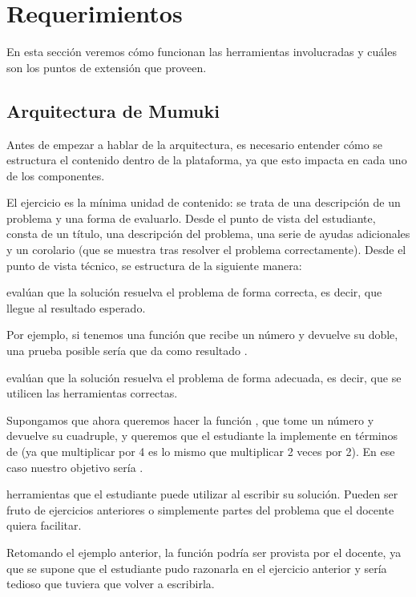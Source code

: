 
\section{Requerimientos}
En esta sección veremos cómo funcionan las herramientas involucradas y cuáles son los puntos de extensión que proveen.

\subsection{Arquitectura de Mumuki}
Antes de empezar a hablar de la arquitectura, es necesario entender cómo se estructura el contenido dentro de la plataforma, ya que esto impacta en cada uno de los componentes.

El ejercicio es la mínima unidad de contenido: se trata de una descripción de un problema y una forma de evaluarlo. Desde el punto de vista del estudiante, consta de un título, una descripción del problema, una serie de ayudas adicionales y un corolario (que se muestra tras resolver el problema correctamente). Desde el punto de vista técnico, se estructura de la siguiente manera:

\begin{itemize}
   evalúan que la solución resuelva el problema de forma correcta, es decir, que llegue al resultado esperado.

  Por ejemplo, si tenemos una función  que recibe un número y devuelve su doble, una prueba posible sería que  da como resultado .

   evalúan que la solución resuelva el problema de forma adecuada, es decir, que se utilicen las herramientas correctas.

  Supongamos que ahora queremos hacer la función , que tome un número y devuelve su cuadruple, y queremos que el estudiante la implemente en términos de  (ya que multiplicar por 4 es lo mismo que multiplicar 2 veces por 2). En ese caso nuestro objetivo sería .

   herramientas que el estudiante puede utilizar al escribir su solución. Pueden ser fruto de ejercicios anteriores o simplemente partes del problema que el docente quiera facilitar.

  Retomando el ejemplo anterior, la función  podría ser provista por el docente, ya que se supone que el estudiante pudo razonarla en el ejercicio anterior y sería tedioso que tuviera que volver a escribirla.
\end{itemize}

